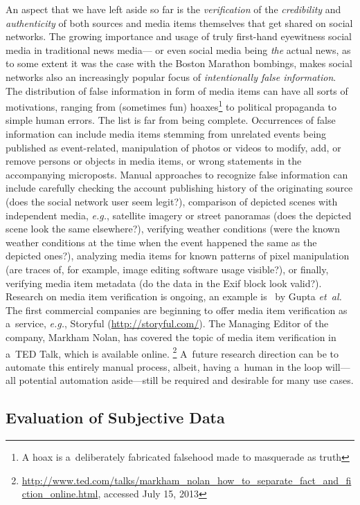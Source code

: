 An aspect that we have left aside so far is the \emph{verification}
of the \emph{credibility} and \emph{authenticity} of both sources
and media items themselves that get shared on social networks.
The growing importance and usage of truly first-hand eyewitness
social media in traditional news media---%
or even social media being \emph{the} actual news,
as to some extent it was the case with the Boston Marathon bombings,
makes social networks also an increasingly popular focus of \emph{intentionally false information}.
The distribution of false information in form of media items
can have all sorts of motivations, ranging from (sometimes fun)
hoaxes\footnote{A hoax is a~deliberately fabricated falsehood made to masquerade as truth}
to political propaganda to simple human errors.
The list is far from being complete.
Occurrences of false information can include
media items stemming from unrelated events being published as event-related,
manipulation  of photos or videos to modify, add, or remove persons or objects in media items,
or wrong statements in the accompanying microposts.
Manual approaches to recognize false information
can include carefully checking the account publishing history
of the originating source (does the social network user seem legit?),
comparison of depicted scenes with independent media,
\emph{e.g.}, satellite imagery or street panoramas
(does the depicted scene look the same elsewhere?),
verifying weather conditions
(were the known weather conditions at the time
when the event happened the same as the depicted ones?),
analyzing media items for known patterns of pixel manipulation
(are traces of, for example, image editing software usage visible?),
or finally, verifying media item metadata
(do the data in the Exif block look valid?).
Research on media item verification is ongoing,
an example is~\cite{gupta2013fakingsandy} by Gupta \emph{et~al.}
The first commercial companies are beginning to offer media item
verification as a~service, \emph{e.g.}, Storyful (\url{http://storyful.com/}).
The Managing Editor of the company, Markham Nolan,
has covered the topic of media item verification
in a~TED Talk, which is available online.%
\footnote{\url{http://www.ted.com/talks/markham_nolan_how_to_separate_fact_and_fiction_online.html},
accessed July 15, 2013}
A~future research direction can be to automate
this entirely manual process, albeit, having a~human in the loop
will---all potential automation aside---still be required
and desirable for many use cases.

\subsection{Evaluation of Subjective Data}


